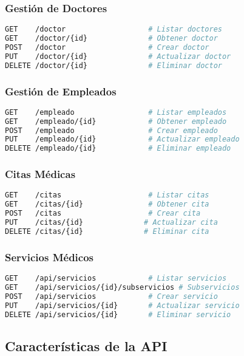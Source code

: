 \documentclass[12pt,a4paper]{article}
\begin{document}
\subsubsection{Gestión de Doctores}
\begin{lstlisting}[language=bash]
GET    /doctor                   # Listar doctores
GET    /doctor/{id}              # Obtener doctor
POST   /doctor                   # Crear doctor
PUT    /doctor/{id}              # Actualizar doctor
DELETE /doctor/{id}              # Eliminar doctor
\end{lstlisting}

\subsubsection{Gestión de Empleados}
\begin{lstlisting}[language=bash]
GET    /empleado                 # Listar empleados
GET    /empleado/{id}            # Obtener empleado
POST   /empleado                 # Crear empleado
PUT    /empleado/{id}            # Actualizar empleado
DELETE /empleado/{id}            # Eliminar empleado
\end{lstlisting}

\subsubsection{Citas Médicas}
\begin{lstlisting}[language=bash]
GET    /citas                    # Listar citas
GET    /citas/{id}               # Obtener cita
POST   /citas                    # Crear cita
PUT    /citas/{id}              # Actualizar cita
DELETE /citas/{id}              # Eliminar cita
\end{lstlisting}

\subsubsection{Servicios Médicos}
\begin{lstlisting}[language=bash]
GET    /api/servicios            # Listar servicios
GET    /api/servicios/{id}/subservicios # Subservicios
POST   /api/servicios            # Crear servicio
PUT    /api/servicios/{id}       # Actualizar servicio
DELETE /api/servicios/{id}       # Eliminar servicio
\end{lstlisting}

\subsection{Características de la API}
\end{document}
